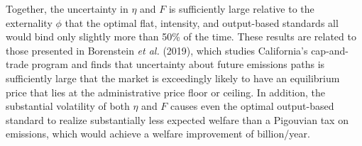 \documentclass[12pt]{article}
\begin{document}
Together, the uncertainty in $\eta$ and $F$ is sufficiently large relative to the externality $\phi$ that the optimal flat, intensity, and output-based standards all would bind only slightly more than 50\% of the time. These results are related to those presented in Borenstein {\it et al.} (2019), which studies California's cap-and-trade program and finds that uncertainty about future emissions paths is sufficiently large that the market is exceedingly likely to have an equilibrium price that lies at the administrative price floor or ceiling. In addition, the substantial volatility of both $\eta$ and $F$ causes even the optimal output-based standard to realize substantially less expected welfare than a Pigouvian tax on emissions, which would achieve a welfare improvement of billion/year. 
\end{document}
